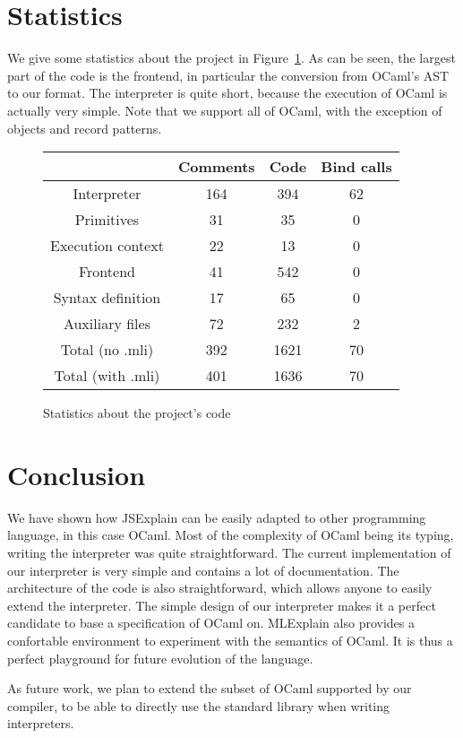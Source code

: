 \documentclass[twocolumn]{article}
\begin{document}
\section{Statistics}

We give some statistics about the project in Figure~\ref{fig:statistics}. As can
be seen, the largest part of the code is the frontend, in particular the
conversion from OCaml's AST to our format. The interpreter is quite short,
because the execution of OCaml is actually very simple. Note that we support all
of OCaml, with the exception of objects and record patterns.

\begin{figure}[hb]
  \begin{tabular}{| c | c | c | c |}
    \hline
    & Comments & Code & Bind calls \\
    \hline
    Interpreter & 164 & 394 & 62 \\
    Primitives & 31 & 35 & 0 \\
    Execution context & 22 & 13 & 0 \\
    Frontend & 41 & 542 & 0 \\
    Syntax definition & 17 & 65 & 0 \\
    Auxiliary files & 72 & 232 & 2 \\
    \hline
    Total (no .mli) & 392 & 1621 & 70 \\
    Total (with .mli) & 401 & 1636 & 70 \\
    \hline
  \end{tabular}

  \centering
  \caption{Statistics about the project's code}
  \label{fig:statistics}
\end{figure}

\section{Conclusion}
We have shown how JSExplain can be easily adapted to other programming language,
in this case OCaml. Most of the complexity of OCaml being its typing, writing
the interpreter was quite straightforward. The current implementation of our
interpreter is very simple and contains a lot of documentation. The
architecture of the code is also straightforward, which allows anyone to easily
extend the interpreter. The simple design of our interpreter makes it a perfect
candidate to base a specification of OCaml on. MLExplain also provides a
confortable environment to experiment with the semantics of OCaml. It is thus a
perfect playground for future evolution of the language.

As future work, we plan to extend the subset of OCaml supported by our
compiler, to be able to directly use the standard library when writing
interpreters.



\end{document}
